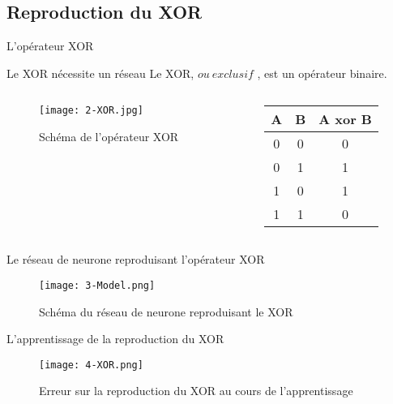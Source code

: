 \subsection{Reproduction du XOR}

\begin{frame}{L'opérateur XOR}
	\begin{block}{Le XOR nécessite un réseau}
		Le XOR, \og $ou\ exclusif$ \fg, est un opérateur binaire. \\
	\end{block}
    \begin{columns}
        \begin{column}{0.6\textwidth}
            \begin{figure}
                \centering
                \texttt{[image: 2-XOR.jpg]}
                \caption{Schéma de l'opérateur XOR}
            \end{figure}
        \end{column}
        \begin{column}[]{0.3\textwidth}
            \begin{center}
                \begin{tabular}{|c c | c|}
                    \hline
                    A & B & A xor B \\ \hline
                    0 & 0 & 0 \\
                    0 & 1 & 1 \\
                    1 & 0 & 1 \\
                    1 & 1 & 0 \\
                    \hline
                \end{tabular}
                \end{center}
        \end{column}
    \end{columns}
\end{frame}



\begin{frame}{Le réseau de neurone reproduisant l'opérateur XOR}
	\begin{figure}
		\centering
		\texttt{[image: 3-Model.png]}
		\caption{Schéma du réseau de neurone reproduisant le XOR}
	\end{figure}
\end{frame}

\begin{frame}{L'apprentissage de la reproduction du XOR}
	\begin{figure}
		\centering
		\texttt{[image: 4-XOR.png]}
		\caption{Erreur sur la reproduction du XOR au cours de l'apprentissage}
	\end{figure}
\end{frame}


